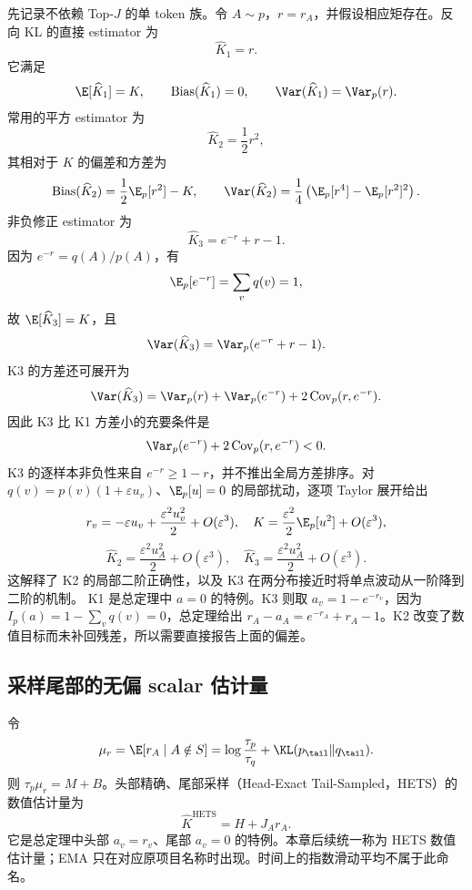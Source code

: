 先记录不依赖 Top-$J$ 的单 token 族。令 $A\sim p$，$r=r_A$，并假设相应矩存在。反向 KL 的直接 estimator 为
\[
 \widehat K_1=r.
\]
它满足
\[
 \E[\widehat K_1]=K,\qquad
 \operatorname{Bias}(\widehat K_1)=0,\qquad
 \Var(\widehat K_1)=\Var_p(r).
\]
常用的平方 estimator 为
\[
 \widehat K_2=\frac12r^2,
\]
其相对于 $K$ 的偏差和方差为
\begin{equation}
 \operatorname{Bias}(\widehat K_2)=\frac12\E_p[r^2]-K,
 \qquad
 \Var(\widehat K_2)=\frac14\left(\E_p[r^4]-\E_p[r^2]^2\right).
 \label{eq:chapter3-k2-bias-var}
\end{equation}
非负修正 estimator 为
\[
 \widehat K_3=e^{-r}+r-1.
\]
因为 $e^{-r}=q(A)/p(A)$，有
\[
 \E_p[e^{-r}]=\sum_vq(v)=1,
\]
故 $\E[\widehat K_3]=K$，且
\begin{equation}
 \Var(\widehat K_3)=\Var_p(e^{-r}+r-1).
 \label{eq:chapter3-k3-var}
\end{equation}
K3 的方差还可展开为
\[
 \Var(\widehat K_3)
 =\Var_p(r)+\Var_p(e^{-r})+2\operatorname{Cov}_p(r,e^{-r}).
\]
因此 K3 比 K1 方差小的充要条件是
\[
 \Var_p(e^{-r})+2\operatorname{Cov}_p(r,e^{-r})<0.
\]
K3 的逐样本非负性来自 $e^{-r}\geq1-r$，并不推出全局方差排序。对 $q(v)=p(v)(1+\varepsilon u_v)$、$\E_p[u]=0$ 的局部扰动，逐项 Taylor 展开给出
\[
 r_v=-\varepsilon u_v+\frac{\varepsilon^2u_v^2}{2}+O(\varepsilon^3),
 \quad K=\frac{\varepsilon^2}{2}\E_p[u^2]+O(\varepsilon^3),
\]
\[
 \widehat K_2=\frac{\varepsilon^2u_A^2}{2}+O(\varepsilon^3),
 \quad \widehat K_3=\frac{\varepsilon^2u_A^2}{2}+O(\varepsilon^3).
\]
这解释了 K2 的局部二阶正确性，以及 K3 在两分布接近时将单点波动从一阶降到二阶的机制。
K1 是总定理中 $a=0$ 的特例。K3 则取 $a_v=1-e^{-r_v}$，因为 $I_p(a)=1-\sum_vq(v)=0$，总定理给出 $r_A-a_A=e^{-r_A}+r_A-1$。K2 改变了数值目标而未补回残差，所以需要直接报告上面的偏差。

\subsection{采样尾部的无偏 scalar 估计量}

令
\[
 \mu_r=\E[r_A\mid A\notin S]
 =\log\frac{\tau_p}{\tau_q}+\KL(p_\tail\Vert q_\tail).
\]
则 $\tau_p\mu_r=M+B$。头部精确、尾部采样（Head-Exact Tail-Sampled，HETS）的数值估计量为
\begin{equation}
 \widehat K^{\mathrm{HETS}}=H+J_A r_A.
 \label{eq:chapter3-ema-scalar}
\end{equation}
它是总定理中头部 $a_v=r_v$、尾部 $a_v=0$ 的特例。本章后续统一称为 HETS 数值估计量；EMA 只在对应原项目名称时出现。时间上的指数滑动平均不属于此命名。

